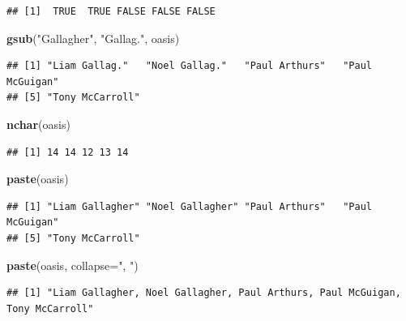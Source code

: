 \documentclass[]{book}
\newenvironment{Shaded}{\begin{snugshade}}{\end{snugshade}}
\newcommand{\KeywordTok}[1]{\textcolor[rgb]{0.13,0.29,0.53}{\textbf{{#1}}}}
\newcommand{\DataTypeTok}[1]{\textcolor[rgb]{0.13,0.29,0.53}{{#1}}}
\newcommand{\DecValTok}[1]{\textcolor[rgb]{0.00,0.00,0.81}{{#1}}}
\newcommand{\StringTok}[1]{\textcolor[rgb]{0.31,0.60,0.02}{{#1}}}
\newcommand{\NormalTok}[1]{{#1}}
\theoremstyle{definition}
\theoremstyle{definition}
\theoremstyle{remark}
\begin{document}
\begin{verbatim}
## [1]  TRUE  TRUE FALSE FALSE FALSE
\end{verbatim}

\begin{Shaded}
\begin{Highlighting}[]
\KeywordTok{gsub}\NormalTok{(}\StringTok{"Gallagher"}\NormalTok{, }\StringTok{"Gallag."}\NormalTok{, oasis)}
\end{Highlighting}
\end{Shaded}

\begin{verbatim}
## [1] "Liam Gallag."   "Noel Gallag."   "Paul Arthurs"   "Paul McGuigan" 
## [5] "Tony McCarroll"
\end{verbatim}

\begin{Shaded}
\begin{Highlighting}[]
\KeywordTok{nchar}\NormalTok{(oasis)}
\end{Highlighting}
\end{Shaded}

\begin{verbatim}
## [1] 14 14 12 13 14
\end{verbatim}

\begin{Shaded}
\begin{Highlighting}[]
\KeywordTok{paste}\NormalTok{(oasis)}
\end{Highlighting}
\end{Shaded}

\begin{verbatim}
## [1] "Liam Gallagher" "Noel Gallagher" "Paul Arthurs"   "Paul McGuigan" 
## [5] "Tony McCarroll"
\end{verbatim}

\begin{Shaded}
\begin{Highlighting}[]
\KeywordTok{paste}\NormalTok{(oasis, }\DataTypeTok{collapse=}\StringTok{", "}\NormalTok{)}
\end{Highlighting}
\end{Shaded}

\begin{verbatim}
## [1] "Liam Gallagher, Noel Gallagher, Paul Arthurs, Paul McGuigan, Tony McCarroll"
\end{verbatim}

\begin{Shaded}
\end{Shaded}
\end{document}
